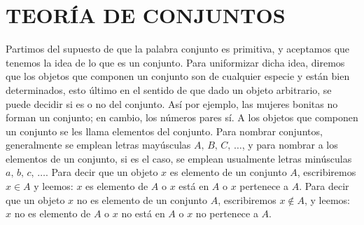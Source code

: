 \chapterspaceabove{6.75cm} %
\chapterspacebelow{7.25cm} %


\chapter{TEORÍA DE CONJUNTOS}\label{chap:3}

Partimos del supuesto de que la palabra conjunto es primitiva, y aceptamos que tenemos la idea de lo que es un conjunto. Para uniformizar dicha idea, diremos que los objetos que componen un conjunto son de cualquier especie y están bien determinados, esto último en el sentido de que dado un objeto arbitrario, se puede decidir si es o no del conjunto. Así por ejemplo, las mujeres bonitas no forman un conjunto; en cambio, los números pares sí. A los objetos que componen un conjunto se les llama elementos del conjunto. Para nombrar conjuntos, generalmente se emplean letras mayúsculas $A, \, B, \, C, \, \dots$, y para nombrar a los elementos de un conjunto, si es el caso, se emplean usualmente letras minúsculas $a, \, b, \, c, \, \dots$. Para decir que un objeto $x$ es elemento de un conjunto $A$, escribiremos $x \in A$ y leemos: $x$ es elemento de $A$ o $x$ está en $A$ o $x$ pertenece a $A$. Para decir que un objeto $x$ no es elemento de un conjunto $A$, escribiremos $x \notin A$, y leemos: $x$ no es elemento de $A$ o $x$ no está en $A$ o $x$ no pertenece a $A$.

